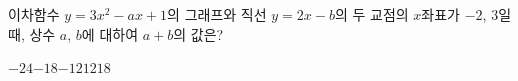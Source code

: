 이차함수 $y=3x^2-ax+1$의 그래프와 직선 $y=2x-b$의 두 교점의 $x$좌표가 $-2$, $3$일 때, 상수 $a$, $b$에 대하여 $a+b$의 값은?
\begin{choices32}{$-24$}{$-18$}{$-12$}{$12$}{$18$}\end{choices32}
